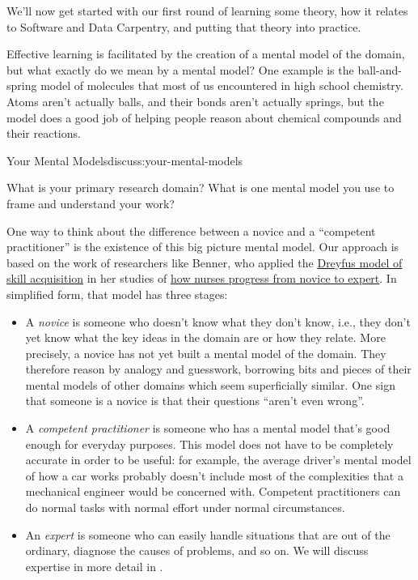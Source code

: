 
We'll now get started with our first round of learning some theory, how
it relates to Software and Data Carpentry, and putting that theory into
practice.


Effective learning is facilitated by the creation of a mental model of
the domain, but what exactly do we mean by a mental model? One example
is the ball-and-spring model of molecules that most of us encountered in
high school chemistry. Atoms aren't actually balls, and their bonds
aren't actually springs, but the model does a good job of helping people
reason about chemical compounds and their reactions.

\begin{discussion}{Your Mental Models}{discuss:your-mental-models}

What is your primary research domain? What is one mental model you use
to frame and understand your work?
\end{discussion}

One way to think about the difference between a novice and a ``competent
practitioner'' is the existence of this big picture mental model. Our
approach is based on the work of researchers like Benner, who applied
the
\href{https://en.wikipedia.org/wiki/Dreyfus\_model\_of\_skill\_acquisition}{Dreyfus
model of skill acquisition} in her studies of
\href{http://www.amazon.com/Novice-Expert-Excellence-Clinical-Practice/dp/020100299X/}{how
nurses progress from novice to expert}. In simplified form, that model
has three stages:

\begin{itemize}
\item
  A \emph{novice} is someone who doesn't know what they don't know,
  i.e., they don't yet know what the key ideas in the domain are or how
  they relate. More precisely, a novice has not yet built a mental model
  of the domain. They therefore reason by analogy and guesswork,
  borrowing bits and pieces of their mental models of other domains
  which seem superficially similar. One sign that someone is a novice is
  that their questions ``aren't even wrong''.
\item
  A \emph{competent practitioner} is someone who has a mental model
  that's good enough for everyday purposes. This model does not have to
  be completely accurate in order to be useful: for example, the average
  driver's mental model of how a car works probably doesn't include most
  of the complexities that a mechanical engineer would be concerned
  with. Competent practitioners can do normal tasks with normal effort
  under normal circumstances.
\item
  An \emph{expert} is someone who can easily handle situations that are
  out of the ordinary, diagnose the causes of problems, and so on. We
  will discuss expertise in more detail in .
\end{itemize}

